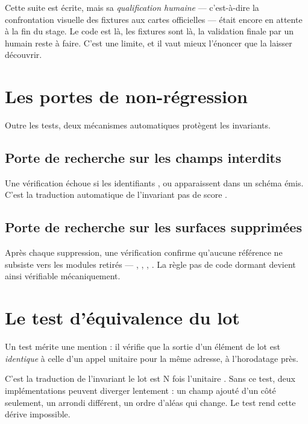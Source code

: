\begin{honesty}
Cette suite est écrite, mais sa \emph{qualification humaine} — c'est-à-dire la
confrontation visuelle des fixtures aux cartes officielles — était encore en
attente à la fin du stage. Le code est là, les fixtures sont là, la validation
finale par un humain reste à faire. C'est une limite, et il vaut mieux
l'énoncer que la laisser découvrir.
\end{honesty}

\section{Les portes de non-régression}

Outre les tests, deux mécanismes automatiques protègent les invariants.

\subsection{Porte de recherche sur les champs interdits}

Une vérification échoue si les identifiants ,  ou
 apparaissent dans un schéma émis. C'est la traduction
automatique de l'invariant \og pas de score \fg.

\subsection{Porte de recherche sur les surfaces supprimées}

Après chaque suppression, une vérification confirme qu'aucune référence ne
subsiste vers les modules retirés — , ,
, . La règle \og pas de code dormant \fg{}
devient ainsi vérifiable mécaniquement.

\section{Le test d'équivalence du lot}

Un test mérite une mention : il vérifie que la sortie d'un élément de lot est
\emph{identique} à celle d'un appel unitaire pour la même adresse, à
l'horodatage près.

C'est la traduction de l'invariant \og le lot est N fois l'unitaire \fg. Sans ce
test, deux implémentations peuvent diverger lentement : un champ ajouté d'un
côté seulement, un arrondi différent, un ordre d'aléas qui change. Le test rend
cette dérive impossible.

